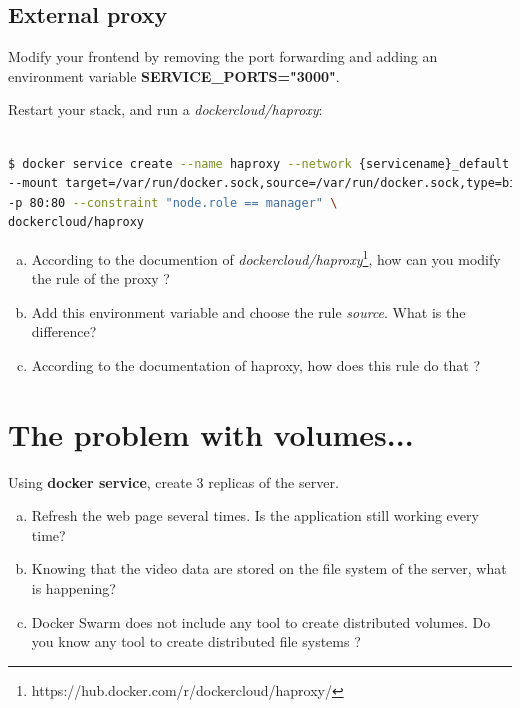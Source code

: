 \documentclass[a4paper,11pt]{exam}
\begin{document}
\subsection{External proxy}

Modify your frontend by removing the port forwarding and adding an environment variable \textbf{SERVICE\_PORTS="3000"}.

Restart your stack, and run a \textit{dockercloud/haproxy}:
\begin{lstlisting}[frame=single,language={sh}]  % Start your code-block

$ docker service create --name haproxy --network {servicename}_default \
--mount target=/var/run/docker.sock,source=/var/run/docker.sock,type=bind \
-p 80:80 --constraint "node.role == manager" \
dockercloud/haproxy

\end{lstlisting}

\begin{questions}
	\question
	\begin{enumerate}[(a)]
		\item According to the documention of \textit{dockercloud/haproxy}\footnote{https://hub.docker.com/r/dockercloud/haproxy/}, how can you modify the rule of the proxy ?
		\item Add this environment variable and choose the rule \textit{source}. What is the difference?
		\item According to the documentation of haproxy, how does this rule do that ?
	\end{enumerate}
\end{questions}


\section{The problem with volumes...}

\begin{questions}
	\question Using \textbf{docker service}, create 3 replicas of the server.
	\begin{enumerate}[(a)]
		\item Refresh the web page several times. Is the application still working every time?
		\item Knowing that the video data are stored on the file system of the server, what is happening?
		\item Docker Swarm does not include any tool to create distributed volumes. Do you know any tool to create distributed file systems ?
	\end{enumerate}
\end{questions}
\end{document}
